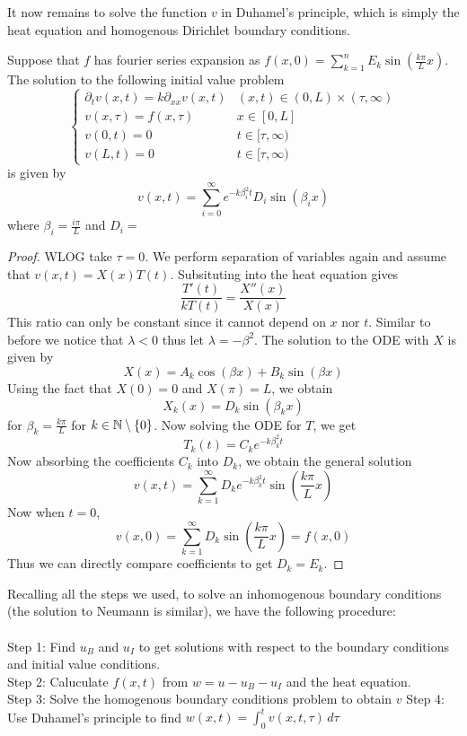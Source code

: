 \documentclass[a4paper]{article}
\begin{document}
It now remains to solve the function $v$ in Duhamel's principle, which is simply the heat equation and homogenous Dirichlet boundary conditions. 

\begin{prp}{}{} Suppose that $f$ has fourier series expansion as $f(x,0)=\sum_{k=1}^nE_k\sin\left(\frac{k\pi}{L}x\right)$. The solution to the following initial value problem $$\begin{cases}
\partial_tv(x,t)=k\partial_{xx}v(x,t) & (x,t)\in(0,L)\times(\tau,\infty)\\
v(x,\tau)=f(x,\tau) & x\in[0,L]\\
v(0,t)=0 & t\in[\tau,\infty)\\
v(L,t)=0 & t\in[\tau,\infty)
\end{cases}$$ is given by $$v(x,t)=\sum_{i=0}^\infty e^{-k\beta_i^2t}D_i\sin(\beta_ix)$$ where $\beta_i=\frac{i\pi}{L}$ and $D_i=$ \tcbline
\begin{proof}
WLOG take $\tau=0$. We perform separation of variables again and assume that $v(x,t)=X(x)T(t)$. Subsituting into the heat equation gives $$\frac{T'(t)}{kT(t)}=\frac{X''(x)}{X(x)}$$ This ratio can only be constant since it cannot depend on $x$ nor $t$. Similar to before we notice that $\lambda<0$ thus let $\lambda=-\beta^2$. The solution to the ODE with $X$ is given by $$X(x)=A_k\cos(\beta x)+B_k\sin(\beta x)$$ Using the fact that $X(0)=0$ and $X(\pi)=L$, we obtain $$X_k(x)=D_k\sin(\beta_k x)$$ for $\beta_k=\frac{k\pi}{L}$ for $k\in\mathbb{N}\setminus\{0\}$. Now solving the ODE for $T$, we get $$T_k(t)=C_ke^{-k\beta_k^2t}$$ Now absorbing the coefficients $C_k$ into $D_k$, we obtain the general solution $$v(x,t)=\sum_{k=1}^\infty D_ke^{-k\beta_k^2t}\sin\left(\frac{k\pi}{L}x\right)$$ Now when $t=0$, $$v(x,0)=\sum_{k=1}^\infty D_k\sin\left(\frac{k\pi}{L}x\right)=f(x,0)$$ Thus we can directly compare coefficients to get $D_k=E_k$. 
\end{proof}
\end{prp}

Recalling all the steps we used, to solve an inhomogenous boundary conditions (the solution to Neumann is similar), we have the following procedure: \\~\\
Step 1: Find $u_B$ and $u_I$ to get solutions with respect to the boundary conditions and initial value conditions. \\
Step 2: Caluculate $f(x,t)$ from $w=u-u_B-u_I$ and the heat equation. \\
Step 3: Solve the homogenous boundary conditions problem to obtain $v$
Step 4: Use Duhamel's principle to find $w(x,t)=\int_0 ^tv(x,t,\tau)\,d\tau$
\end{document}
